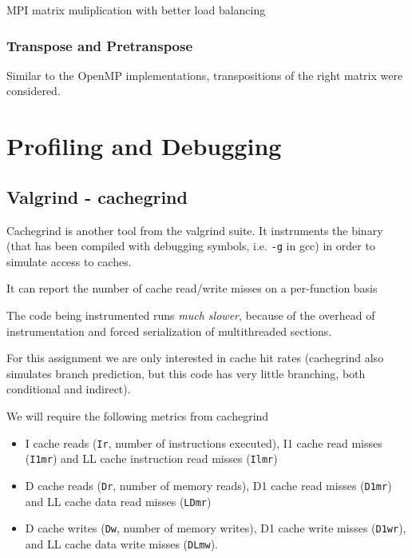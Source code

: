 \documentclass[a4paper]{article}
\newenvironment{code}{\captionsetup{type=listing}}{}
\begin{document}
\begin{code}
\inputminted[samepage=false, breaklines, linenos, firstline=106, lastline=206]{c}{../src/impl_mpi.c}
\label{lst:matmul_mpi_balanced}
\caption{MPI matrix muliplication with better load balancing}
\end{code}

\subsubsection*{Transpose and Pretranspose}
Similar to the OpenMP implementations, transpositions of the right
matrix were considered.

\section*{Profiling and Debugging}
\subsection*{Valgrind - cachegrind}
Cachegrind is another tool from the valgrind suite. It
instruments the binary (that has been compiled with debugging
symbols, i.e. \texttt{-g} in gcc) in order to simulate access
to caches.

It can report the  number of cache read/write misses on a per-function basis

The code being instrumented runs \textit{much slower}, because
of the overhead of instrumentation and forced serialization of
multithreaded sections.

For this assignment we are only interested in cache hit rates
(cachegrind also simulates branch prediction, but this code
has very little branching, both conditional and indirect).

We will require the following metrics from cachegrind
\begin{itemize}
    \item I cache reads (\texttt{Ir}, number of instructions executed), I1 cache read misses (\texttt{I1mr}) and LL cache instruction read misses (\texttt{Ilmr})
    \item D cache reads (\texttt{Dr}, number of memory reads), D1 cache read misses (\texttt{D1mr}) and LL cache data read misses (\texttt{LDmr})
    \item D cache writes (\texttt{Dw}, number of memory writes),
        D1 cache write misses (\texttt{D1wr}), and LL cache data write misses (\texttt{DLmw}).
\end{itemize}
\end{document}
